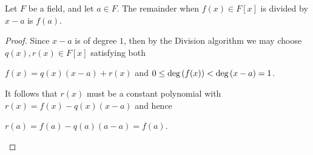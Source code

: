 \documentclass[11pt,fleqn,dvipsnames,usenames]{article}
\begin{document}
%
\begin{theorem}
Let $F$ be a field, and let $a\in F$.  The remainder when $f(x)\in F[x]$ is divided by $x - a$ is $f(a)$.
\end{theorem}
%
\begin{proof}
Since $x-a$ is of degree $1$, then by the Division algorithm we may choose $q(x),r(x)\in F[x]$ satisfying both
\begin{center}
$f(x) = q(x)(x - a) + r(x)$ and $0 \leq \text{deg}\left(f(x)\right) < \text{deg}\left(x - a\right) = 1$.
\end{center}
It follows that $r(x)$ must be a constant polynomial with $r(x) = f(x) - q(x)(x - a)$ and hence
\begin{center}
\hfill $r(a) = f(a) - q(a)(a - a) = f(a)$. \hfill \qedhere
\end{center}
\end{proof}
\end{document}
